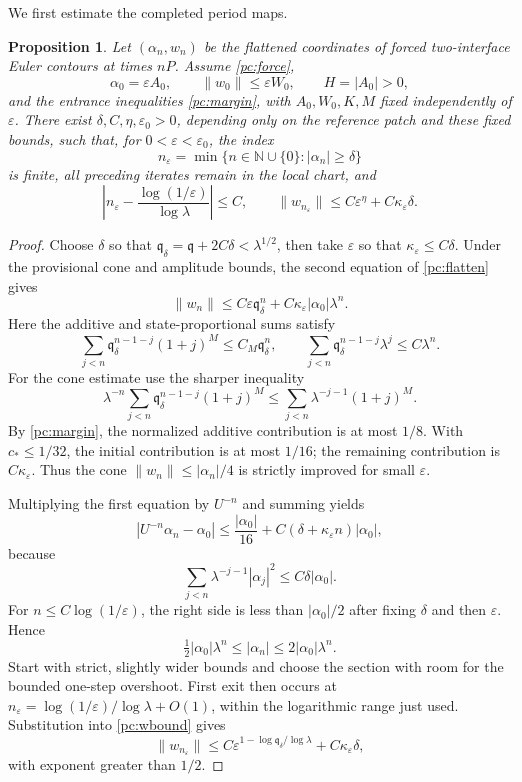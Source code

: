 \documentclass[11pt]{amsart}
\newtheorem{proposition}[theorem]{Proposition}
\theoremstyle{remark}
\numberwithin{equation}{section}
\begin{document}
We first estimate the completed period maps.

\begin{proposition}
\label{pc:capture}
Let $(\alpha_n,w_n)$ be the flattened coordinates of forced
two-interface Euler contours at times $nP$. Assume
\eqref{pc:force},
\[
 \alpha_0=\varepsilon A_0,\qquad \|w_0\|\le\varepsilon W_0,
 \qquad H=|A_0|>0,
\]
and the entrance inequalities \eqref{pc:margin}, with
$A_0,W_0,K,M$ fixed independently of $\varepsilon$.
There exist $\delta,C,\eta,\varepsilon_0>0$, depending only on
the reference patch and these fixed bounds, such that, for
$0<\varepsilon<\varepsilon_0$, the index
\[
 n_\varepsilon=\min\{n\in\mathbb N\cup\{0\}:|\alpha_n|\ge\delta\}
\]
is finite, all preceding iterates remain in the local chart, and
\[
 \left|n_\varepsilon-
        \frac{\log(1/\varepsilon)}{\log\lambda}\right|\le C,
 \qquad
 \|w_{n_\varepsilon}\|\le
        C\varepsilon^\eta+C\kappa_\varepsilon\delta.
\]
\end{proposition}
\begin{proof}
Choose $\delta$ so that
$\mathfrak q_\delta=\mathfrak q+2C\delta<\lambda^{1/2}$,
then take $\varepsilon$ so that $\kappa_\varepsilon\le C\delta$.
Under the provisional cone and amplitude bounds, the second
equation of \eqref{pc:flatten} gives
\begin{equation}\label{pc:wbound}
 \|w_n\|\le C\varepsilon\mathfrak q_\delta^n
       +C\kappa_\varepsilon|\alpha_0|\lambda^n.
\end{equation}
Here the additive and state-proportional sums satisfy
\[
 \sum_{j<n}\mathfrak q_\delta^{n-1-j}(1+j)^M
       \le C_M\mathfrak q_\delta^n,\qquad
 \sum_{j<n}\mathfrak q_\delta^{n-1-j}\lambda^j\le C\lambda^n.
\]
For the cone estimate use the sharper inequality
\[
 \lambda^{-n}\sum_{j<n}\mathfrak q_\delta^{n-1-j}(1+j)^M
       \le\sum_{j<n}\lambda^{-j-1}(1+j)^M.
\]
By \eqref{pc:margin}, the normalized additive contribution is
at most $1/8$. With $c_*\le1/32$, the initial contribution is
at most $1/16$; the remaining contribution is
$C\kappa_\varepsilon$. Thus the cone $\|w_n\|\le|\alpha_n|/4$
is strictly improved for small $\varepsilon$.

Multiplying the first equation by $U^{-n}$ and summing yields
\[
 |U^{-n}\alpha_n-\alpha_0|
 \le\frac{|\alpha_0|}{16}
       +C(\delta+\kappa_\varepsilon n)|\alpha_0|,
\]
because
\[
 \sum_{j<n}\lambda^{-j-1}|\alpha_j|^2
       \le C\delta|\alpha_0|.
\]
For $n\le C\log(1/\varepsilon)$, the right side is less than
$|\alpha_0|/2$ after fixing $\delta$ and then $\varepsilon$.
Hence
\[
 \tfrac12|\alpha_0|\lambda^n\le|\alpha_n|
       \le2|\alpha_0|\lambda^n.
\]
Start with strict, slightly wider bounds and choose the section
with room for the bounded one-step overshoot. First exit then
occurs at $n_\varepsilon=\log(1/\varepsilon)/\log\lambda+O(1)$,
within the logarithmic range just used. Substitution into
\eqref{pc:wbound} gives
\[
 \|w_{n_\varepsilon}\|
 \le C\varepsilon^{1-\log\mathfrak q_\delta/\log\lambda}
       +C\kappa_\varepsilon\delta,
\]
with exponent greater than $1/2$.
\end{proof}
\end{document}
